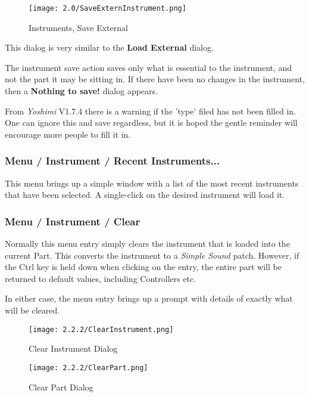 \begin{figure}[H]
   \centering
   \texttt{[image: 2.0/SaveExternInstrument.png]}
   \caption{Instruments, Save External}
   \label{fig:instruments_save_external}
\end{figure}

   This dialog is very similar to the \textbf{Load External} dialog.

   The instrument save action saves only what is essential to the instrument,
   and not the part it may be sitting in.  If there have been no changes in the
   instrument, then a \textbf{Nothing to save!} dialog appears.

   From \textsl{Yoshimi} V1.7.4 there is a warning if the 'type' filed has
   not been filled in. One can ignore this and save regardless, but it is
   hoped the gentle reminder will encourage more people to fill it in.

\subsubsection{Menu / Instrument / Recent Instruments...}
\label{subsubsec:menu_instrument_recent}

   This menu brings up a simple window with a list of the most recent
   instruments that have been selected.  A single-click on the desired
   instrument will load it.

\subsubsection{Menu / Instrument / Clear}
\label{subsubsec:menu_instrument_clear}

   Normally this menu entry simply clears the instrument that is loaded into
   the current Part.  This converts the instrument to a
   \textsl{Simple Sound} patch.
   However, if the Ctrl key is held down when clicking on the entry, the entire
   part will be returned to default values, including Controllers etc.

   In either case, the menu entry brings up a prompt with details of exactly what
   will be cleared.

\begin{figure}[H]
   \centering
   \texttt{[image: 2.2.2/ClearInstrument.png]}
   \caption{Clear Instrument Dialog}
   \label{fig:clear_instrument_dialog}
\end{figure}
\begin{figure}[H]
   \centering
   \texttt{[image: 2.2.2/ClearPart.png]}
   \caption{Clear Part Dialog}
   \label{fig:clear_part_dialog}
\end{figure}

